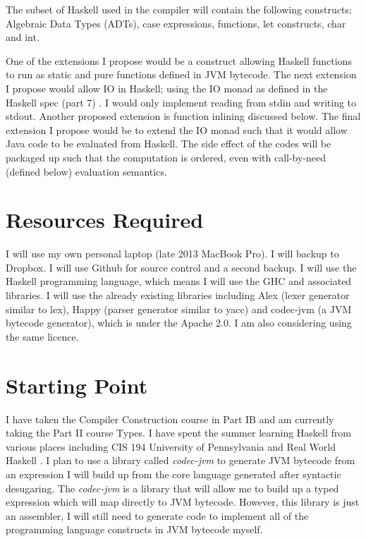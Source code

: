\documentclass[12pt,a4paper,twoside]{article}
\begin{document}
  The subset of Haskell used in the compiler will contain the following constructs: Algebraic Data Types (ADTs), case expressions,
  functions, let constructs, char and int.

  One of the extensions I propose would be a construct allowing Haskell functions to run as static and pure functions defined in JVM bytecode.
  The next extension I propose would allow IO in Haskell; using the IO monad as defined in the Haskell spec (part 7) \cite{haskell98-spec}.
  I would only implement reading from stdin and writing to stdout. Another proposed extension is function inlining discussed below.
  The final extension I propose would be to extend the IO monad such that it would allow Java code to be evaluated from Haskell. The side effect of the codes
  will be packaged up such that the computation is ordered, even with call-by-need (defined below) evaluation semantics.

\section*{Resources Required}
  I will use my own personal laptop (late 2013 MacBook Pro).
  I will backup to Dropbox.
  I will use Github for source control and a second backup.
  I will use the Haskell programming language, which means I will use the GHC and associated libraries.
  I will use the already existing libraries including Alex (lexer generator similar to lex),
  Happy (parser generator similar to yacc) and codec-jvm (a JVM bytecode generator), which is under the Apache 2.0. I am also considering using the same licence.

\section*{Starting Point}
  I have taken the Compiler Construction course in Part IB and am currently taking the Part II course Types. I have spent the summer
  learning Haskell from various places including CIS 194 University of Pennsylvania \cite{cis194} and Real World Haskell \cite{realworldhaskell}.
  I plan to use a library called \textit{codec-jvm} to generate JVM bytecode from an expression I will build up from the core language generated after
  syntactic desugaring. The \textit{codec-jvm} is a library that will allow me to build up a typed expression which will map directly
  to JVM bytecode. However, this library is just an assembler, I will still need to generate code to implement all of the
  programming language constructs in JVM bytecode myself.
\end{document}
